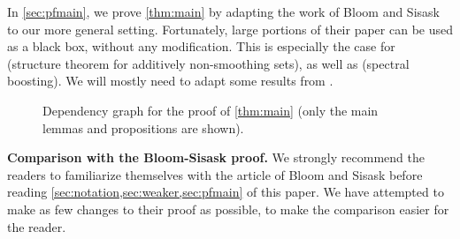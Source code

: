 \documentclass{daj}
\theoremstyle{definition}
\begin{document}
In \cref{sec:pfmain}, we prove \cref{thm:main} by adapting the work of Bloom and Sisask \cite{BS} to our more general setting. Fortunately, large portions of their paper can be used as a black box, without any modification. This is especially the case for \cite[Sections~9~and~10]{BS} (structure theorem for additively non-smoothing sets), as well as \cite[Section~11]{BS} (spectral boosting). We will mostly need to adapt some results from \cite[Sections 5,~8~and~12]{BS}. 



\begin{figure}[H]
\centering
{}
\caption{Dependency graph for the proof of \cref{thm:main} (only the main lemmas and propositions are shown).}
\label{fig:dependency}
\end{figure}


\smallbreak
\textbf{Comparison with the Bloom-Sisask proof.}
We strongly recommend the readers to familiarize themselves with the article of Bloom and Sisask before reading \cref{sec:notation,sec:weaker,sec:pfmain} of this paper. We have attempted to make as few changes to their proof as possible, to make the comparison easier for the reader. 
\end{document}
